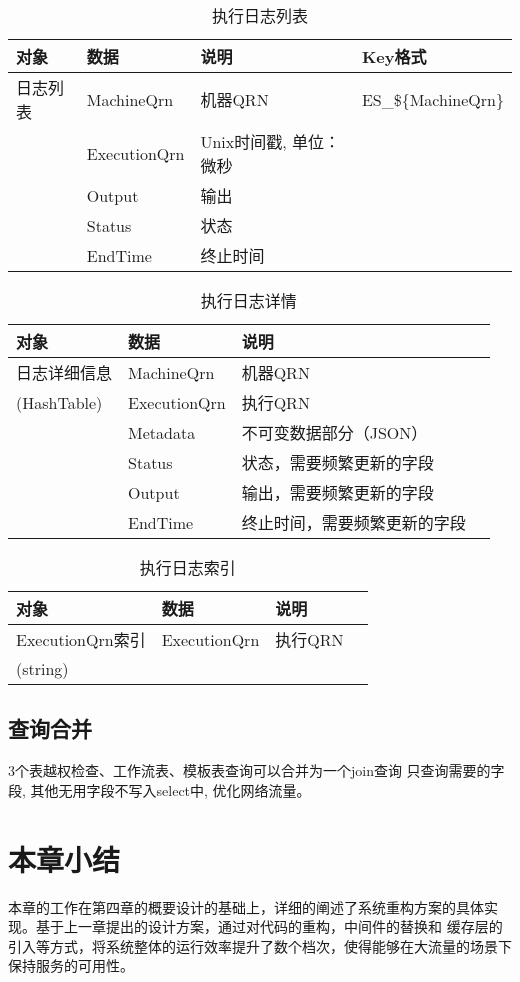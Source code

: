     \begin{table}[H]
        \centering
        \caption{执行日志列表}
        \label{tab:key-log-list}
        \begin{tabular}{lp{10em}ll}
            \toprule
            对象   & 数据               & 说明 & Key格式 \\
            \midrule
            日志列表     & MachineQrn    & 机器QRN                    & ES\_\$\{MachineQrn\} \\
            & ExecutionQrn  & Unix时间戳, 单位：微秒 &\\
            & Output        & 输出 &\\
            & Status        & 状态 &\\
            & EndTime       & 终止时间 &\\
            \bottomrule
        \end{tabular}
    \end{table}

    \begin{table}[H]
        \centering
        \caption{执行日志详情}
        \label{tab:key-log-hash}
        \begin{tabular}{lp{8em}lp{8em}}
            \toprule
            对象   & 数据               & 说明\\
            \midrule
            日志详细信息 & MachineQrn    & 机器QRN\\
            (HashTable) & ExecutionQrn  & 执行QRN\\
            & Metadata      & 不可变数据部分（JSON）\\
            & Status        & 状态，需要频繁更新的字段\\
            & Output        & 输出，需要频繁更新的字段\\
            & EndTime       & 终止时间，需要频繁更新的字段\\
            \bottomrule
        \end{tabular}
    \end{table}

    \begin{table}[H]
        \centering
        \caption{执行日志索引}
        \label{tab:key-log-index}
        \begin{tabular}{lp{10em}ll}
            \toprule
            对象   & 数据               & 说明\\
            \midrule
            ExecutionQrn索引 & ExecutionQrn    & 执行QRN\\
            (string) &&& \\
            \bottomrule
        \end{tabular}
    \end{table}

\subsection{查询合并}
3个表越权检查、工作流表、模板表查询可以合并为一个join查询
只查询需要的字段, 其他无用字段不写入select中, 优化网络流量。


\section{本章小结}
本章的工作在第四章的概要设计的基础上，详细的阐述了系统重构方案的具体实现。基于上一章提出的设计方案，通过对代码的重构，中间件的替换和
缓存层的引入等方式，将系统整体的运行效率提升了数个档次，使得能够在大流量的场景下保持服务的可用性。